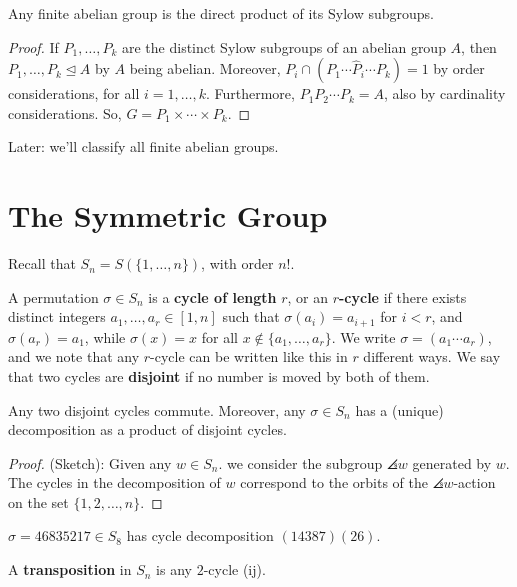 \begin{ex}
    Any finite abelian group is the direct product of its Sylow subgroups.
    \begin{proof}
        If $P_1,\dots,P_k$ are the distinct Sylow subgroups of an abelian group $A$, then $P_1,\dots,P_k \unlhd A$ by $A$ being abelian. Moreover, $P_i \cap (P_1\cdots \hat P_i \cdots P_k) =1$ by order considerations, for all $i=1,\dots,k$. Furthermore, $P_1P_2\cdots P_k=A$, also by cardinality considerations. So, $G=P_1\times \cdots \times P_k$.
    \end{proof}
\end{ex}

Later: we'll classify all finite abelian groups.

\section{The Symmetric Group}

Recall that $S_n = S(\{1,\dots,n\})$, with order $n!$.

\begin{defn}
    A permutation $\sigma \in S_n$ is a \textbf{cycle of length} $r$, or an $r$\textbf{-cycle} if there exists distinct integers $a_1,\dots,a_r \in [1,n]$ such that $\sigma(a_i)=a_{i+1}$ for $i < r$, and $\sigma(a_r) = a_1$, while $\sigma(x)=x$ for all $x \not \in \{a_1,\dots,a_r\}$. We write $\sigma =(a_1 \cdots a_r)$, and we note that any $r$-cycle can be written like this in $r$ different ways. We say that two cycles are \textbf{disjoint} if no number is moved by both of them.
\end{defn}

\begin{prop}
    Any two disjoint cycles commute. Moreover, any $\sigma \in S_n$ has a (unique) decomposition as a product of disjoint cycles.
\end{prop}

\begin{proof}
    (Sketch): Given any $w \in S_n$. we consider the subgroup $\angles{w}$ generated by $w$. The cycles in the decomposition of $w$ correspond to the orbits of the $\angles{w}$-action on the set $\{1,2,\dots,n\}$.
\end{proof}

\begin{ex}
    $\sigma = 46835217 \in S_8$ has cycle decomposition $(14387)(26)$.
\end{ex}

\begin{defn}
    A \textbf{transposition} in $S_n$ is any $2$-cycle (ij).
\end{defn}

